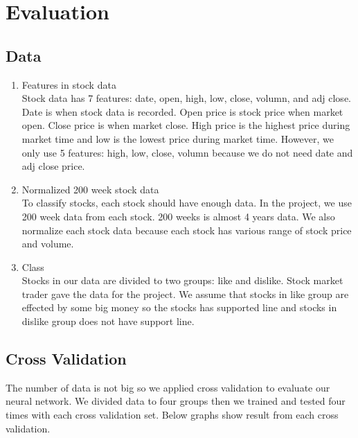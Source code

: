 \documentclass[12pt]{article}
\begin{document}
\section{Evaluation}
\subsection{Data}
\begin{enumerate}
	\item Features in stock data\\
		Stock data has 7 features: date, open, high, low, close, volumn, and adj close. Date is when stock data is recorded. Open price is stock price when market open. Close price is when market close. High price is the highest price during market time and low is the lowest price during market time. However, we only use 5 features: high, low, close, volumn because we do not need date and adj close price. 
		
	\item Normalized 200 week stock data\\
		To classify stocks, each stock should have enough data. In the project, we use 200 week data from each stock. 200 weeks is almost 4 years data. We also normalize each stock data because each stock has various range of stock price and volume.
		
	\item Class\\
		Stocks in our data are divided to two groups: like and dislike. Stock market trader gave the data for the project. We assume that stocks in like group are effected by some big money so the stocks has supported line and stocks in dislike group does not have support line. 
\end{enumerate}

\subsection{Cross Validation}
The number of data is not big so we applied cross validation to evaluate our neural network. We divided data to four groups then we trained and tested four times with each cross validation set. Below graphs show result from each cross validation.
\end{document}
